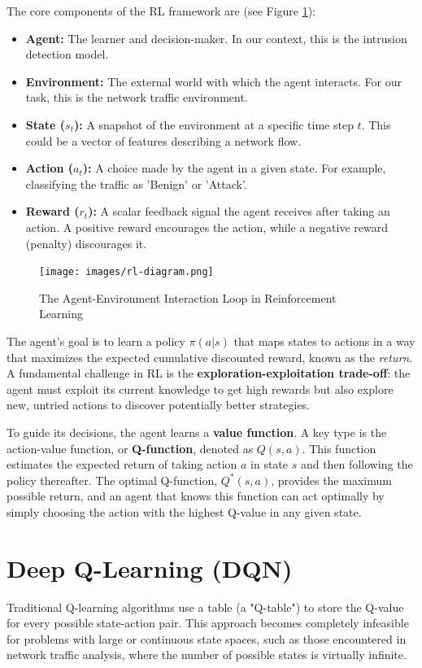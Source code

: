 \documentclass[12pt]{report}
\begin{document}
The core components of the RL framework are (see Figure \ref{fig:rl-diagram}):
\begin{itemize}
    \item \textbf{Agent:} The learner and decision-maker. In our context, this is the intrusion detection model.
    \item \textbf{Environment:} The external world with which the agent interacts. For our task, this is the network traffic environment.
    \item \textbf{State ($s_t$):} A snapshot of the environment at a specific time step $t$. This could be a vector of features describing a network flow.
    \item \textbf{Action ($a_t$):} A choice made by the agent in a given state. For example, classifying the traffic as 'Benign' or 'Attack'.
    \item \textbf{Reward ($r_t$):} A scalar feedback signal the agent receives after taking an action. A positive reward encourages the action, while a negative reward (penalty) discourages it.
\end{itemize}

\begin{figure}[H]
    \centering
    \texttt{[image: images/rl-diagram.png]}
    \caption{The Agent-Environment Interaction Loop in Reinforcement Learning}
    \label{fig:rl-diagram}
\end{figure}

The agent's goal is to learn a policy $\pi(a|s)$ that maps states to actions in a way that maximizes the expected cumulative discounted reward, known as the \textit{return}. A fundamental challenge in RL is the \textbf{exploration-exploitation trade-off}: the agent must exploit its current knowledge to get high rewards but also explore new, untried actions to discover potentially better strategies.

To guide its decisions, the agent learns a \textbf{value function}. A key type is the action-value function, or \textbf{Q-function}, denoted as $Q(s, a)$. This function estimates the expected return of taking action $a$ in state $s$ and then following the policy thereafter. The optimal Q-function, $Q^*(s, a)$, provides the maximum possible return, and an agent that knows this function can act optimally by simply choosing the action with the highest Q-value in any given state.

\section{Deep Q-Learning (DQN)}
Traditional Q-learning algorithms use a table (a "Q-table") to store the Q-value for every possible state-action pair. This approach becomes completely infeasible for problems with large or continuous state spaces, such as those encountered in network traffic analysis, where the number of possible states is virtually infinite.
\end{document}
